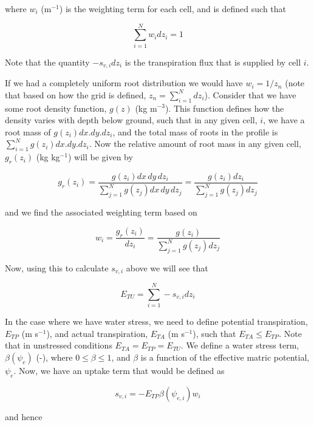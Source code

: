 \documentclass[10pt,a4paper]{article}
\begin{document}
where $w_i$ (m$^{-1}$) is the weighting term for each cell, and is defined such that

\begin{equation}
\sum_{i=1}^N w_i dz_i = 1
\end{equation}

Note that the quantity $-s_{v,i}dz_i$ is the transpiration flux that is supplied by cell $i$.

If we had a completely uniform root distribution we would have $w_i=1/z_n$ (note that based on how the grid is defined, $z_n=\sum_{i=1}^N dz_i$). Consider that we have some root density function, $g(z)$ (kg m$^{-3}$). This function defines how the density varies with depth below ground, such that in any given cell, $i$, we have a root mass of $g(z_i)dx.dy.dz_i$, and the total mass of roots in the profile is $\sum_{i=1}^Ng(z_i)dx.dy.dz_i$. Now the relative amount of root mass in any given cell, $g_r(z_i)$ (kg kg$^{-1}$) will be given by

\begin{equation}
g_r(z_i)=\frac{g(z_i)dx\,dy\,dz_i}{\sum_{j=1}^N g(z_j) dx\,dy\,dz_j}
=\frac{g(z_i)dz_i}{\sum_{j=1}^N g(z_j)dz_j}
\end{equation}

and we find the associated weighting term based on 

\begin{equation}
w_i=\frac{g_r(z_i)}{dz_i}=\frac{g(z_i)}{\sum_{j=1}^N g(z_j) dz_j}
\end{equation}

Now, using this to calculate $s_{v,i}$ above we will see that

\begin{equation}
E_{TU}=\sum_{i=1}^N-s_{v,i}dz_i
\end{equation}

In the case where we have water stress, we need to define potential transpiration, $E_{TP}$ (m s$^{-1}$), and actual transpiration, $E_{TA}$ (m s$^{-1}$), such that $E_{TA}\leq E_{TP}$. Note that in unstressed conditions $E_{TA}=E_{TP}=E_{TU}$. We define a water stress term, $\beta(\psi_e)$ (-), where $0\leq\beta\leq 1$, and $\beta$ is a function of the effective matric potential, $\psi_e$. Now, we have an uptake term that would be defined as 

\begin{equation}
s_{v,i}=-E_{TP}\beta(\psi_{e,i})w_i
\end{equation}

and hence
\end{document}

